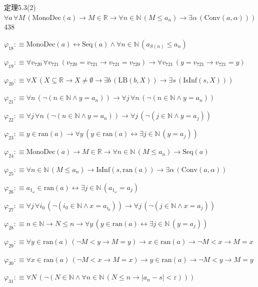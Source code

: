 \begin{fullproof}{定理5.3(2)}{$\forall a\,\forall M\,(\mathrm{MonoDec}(a) \to M \in \mathbb{R} \to \forall n \in \mathbb{N}\,(M \leq a_{n}) \to \exists \alpha\,(\mathrm{Conv}(a,\alpha)))$}{438}
\begin{abbrevlist}
\item $\varphi_{18} :\equiv \mathrm{MonoDec}(a) \leftrightarrow \mathrm{Seq}(a) \land \forall n \in \mathbb{N}\,(a_{S(n)} \leq a_{n})$
\item $\varphi_{19} :\equiv \forall v_{720}\,\forall v_{721}\,(v_{720} = v_{721} \to v_{721} = v_{720}) \to \forall v_{721}\,(y = v_{721} \to v_{721} = y)$
\item $\varphi_{20} :\equiv \forall X\,(X \subseteq \mathbb{R} \to X \neq \emptyset \to \exists b\,(\mathrm{LB}(b,X)) \to \exists s\,(\mathrm{IsInf}(s,X)))$
\item $\varphi_{21} :\equiv \forall n\,(\neg (n \in \mathbb{N} \land y = a_{n})) \to \forall j\,\forall n\,(\neg (n \in \mathbb{N} \land y = a_{n}))$
\item $\varphi_{22} :\equiv \forall j\,\forall n\,(\neg (n \in \mathbb{N} \land y = a_{n})) \to \forall j\,(\neg (j \in \mathbb{N} \land y = a_{j}))$
\item $\varphi_{23} :\equiv y \in \mathrm{ran}(a) \to \forall y\,(y \in \mathrm{ran}(a) \leftrightarrow \exists j \in \mathbb{N}\,(y = a_{j}))$
\item $\varphi_{24} :\equiv \mathrm{MonoDec}(a) \to M \in \mathbb{R} \to \forall n \in \mathbb{N}\,(M \leq a_{n}) \to \mathrm{Seq}(a)$
\item $\varphi_{25} :\equiv \forall n \in \mathbb{N}\,(M \leq a_{n}) \to \mathrm{IsInf}(s,\mathrm{ran}(a)) \to \exists \alpha\,(\mathrm{Conv}(a,\alpha))$
\item $\varphi_{26} :\equiv a_{1_{\omega}} \in \mathrm{ran}(a) \leftrightarrow \exists j \in \mathbb{N}\,(a_{1_{\omega}} = a_{j})$
\item $\varphi_{27} :\equiv \forall j\,\forall i_{0}\,(\neg (i_{0} \in \mathbb{N} \land x = a_{i_{0}})) \to \forall j\,(\neg (j \in \mathbb{N} \land x = a_{j}))$
\item $\varphi_{28} :\equiv n \in \mathbb{N} \to N \leq n \to \forall y\,(y \in \mathrm{ran}(a) \leftrightarrow \exists j \in \mathbb{N}\,(y = a_{j}))$
\item $\varphi_{29} :\equiv \forall y \in \mathrm{ran}(a)\,(\neg M < y \to M = y) \to x \in \mathrm{ran}(a) \to \neg M < x \to M = x$
\item $\varphi_{30} :\equiv \forall x \in \mathrm{ran}(a)\,(\neg M < x \to M = x) \to y \in \mathrm{ran}(a) \to \neg M < y \to M = y$
\item $\varphi_{31} :\equiv \forall N\,(\neg (N \in \mathbb{N} \land \forall n \in \mathbb{N}\,(N \leq n \to \lvert a_{n} - s \rvert < \varepsilon)))$

\end{abbrevlist}
\end{fullproof}

